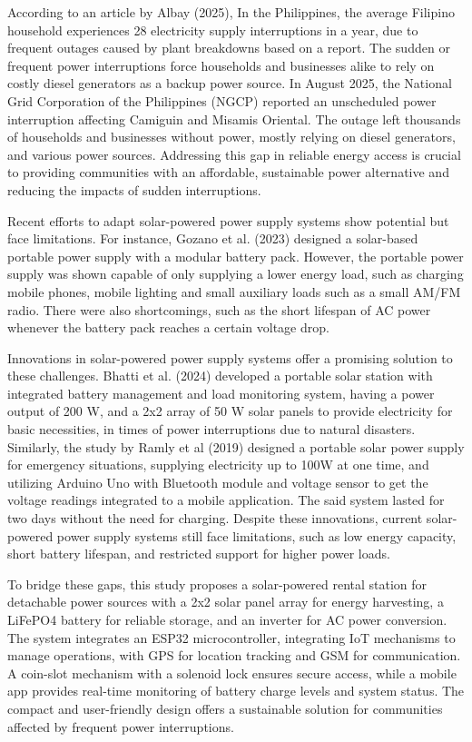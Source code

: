 { According to an article by Albay (2025), In the Philippines, the average Filipino household experiences 28 electricity supply interruptions in a year, due to frequent outages caused by plant breakdowns based on a report. The sudden or frequent power interruptions force households and businesses alike to rely on costly diesel generators as a  backup power source. In August  2025, the National Grid Corporation of the Philippines (NGCP) reported an unscheduled power interruption affecting Camiguin and Misamis Oriental. The outage left thousands of households and businesses without power, mostly relying on diesel generators, and various power sources. Addressing this gap in reliable energy access is crucial to providing communities with an affordable, sustainable power alternative and reducing the impacts of sudden interruptions.

 Recent efforts to adapt solar-powered power supply systems show potential but face limitations. For instance, Gozano et al. (2023) designed a solar-based portable power supply with a modular battery pack. However, the portable power supply was shown capable of only supplying a lower energy load, such as charging mobile phones, mobile lighting and small auxiliary loads such as a small AM/FM radio. There were also shortcomings, such as the short lifespan of AC power whenever the battery pack reaches a certain voltage drop. 

Innovations in solar-powered power supply systems offer a promising solution to these challenges. Bhatti et al. (2024) developed a portable solar station with integrated battery management and load monitoring system, having a power output of 200 W, and a 2x2 array of 50 W solar panels to provide electricity for basic necessities, in times of power interruptions due to natural disasters. Similarly,  the study by Ramly et al (2019) designed a portable solar power supply for emergency situations, supplying electricity up to 100W at one time, and utilizing Arduino Uno with Bluetooth module and voltage sensor to get the voltage readings integrated to a mobile application.  The said system lasted for two days without the need for charging. Despite these innovations, current solar-powered power supply systems still face limitations, such as low energy capacity, short battery lifespan, and restricted support for higher power loads.

To bridge these gaps, this study proposes a solar-powered rental station for detachable power sources with a 2x2 solar panel array for energy harvesting, a LiFePO4 battery for reliable storage, and an inverter for AC power conversion. The system integrates an ESP32 microcontroller, integrating IoT mechanisms to manage operations, with GPS for location tracking and GSM for communication. A coin-slot mechanism with a solenoid lock ensures secure access, while a mobile app provides real-time monitoring of battery charge levels and system status. The compact and user-friendly design offers a sustainable solution for communities affected by frequent power interruptions.


}
